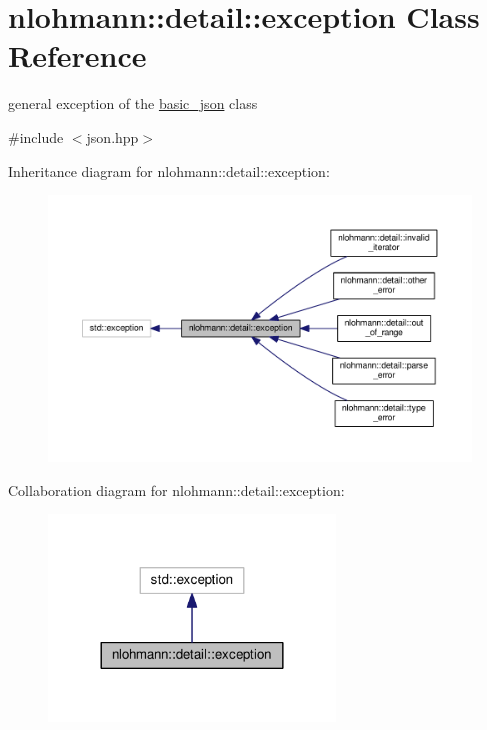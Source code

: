 \hypertarget{classnlohmann_1_1detail_1_1exception}{}\section{nlohmann\+:\+:detail\+:\+:exception Class Reference}
\label{classnlohmann_1_1detail_1_1exception}


general exception of the \hyperlink{classnlohmann_1_1basic__json}{basic\+\_\+json} class  




{\ttfamily \#include $<$json.\+hpp$>$}



Inheritance diagram for nlohmann\+:\+:detail\+:\+:exception\+:\nopagebreak
\begin{figure}[H]
\begin{center}
\leavevmode
\includegraphics[width=350pt]{classnlohmann_1_1detail_1_1exception__inherit__graph}
\end{center}
\end{figure}


Collaboration diagram for nlohmann\+:\+:detail\+:\+:exception\+:\nopagebreak
\begin{figure}[H]
\begin{center}
\leavevmode
\includegraphics[width=216pt]{classnlohmann_1_1detail_1_1exception__coll__graph}
\end{center}
\end{figure}
